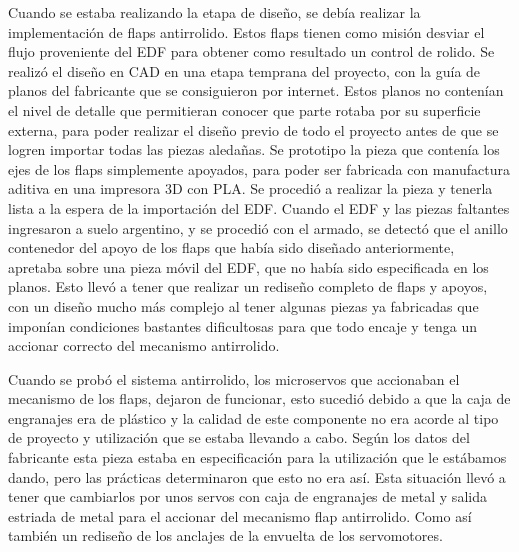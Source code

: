 Cuando se estaba realizando la etapa de diseño, se debía realizar la implementación de flaps antirrolido. Estos flaps tienen como misión desviar el flujo proveniente del EDF para obtener como resultado un control de rolido. Se realizó el diseño en CAD en una etapa temprana del proyecto, con la guía de planos del fabricante que se consiguieron por internet. Estos planos no contenían el nivel de detalle que permitieran conocer que parte rotaba por su superficie externa, para poder realizar el diseño previo de todo el proyecto antes de que se logren importar todas las piezas aledañas. Se prototipo la pieza que contenía los ejes de los flaps simplemente apoyados, para poder ser fabricada con manufactura aditiva en una impresora 3D con PLA. Se procedió a realizar la pieza y tenerla lista a la espera de la importación del EDF. Cuando el EDF y las piezas faltantes ingresaron a suelo argentino, y se procedió con el armado, se detectó que el anillo contenedor del apoyo de los flaps que había sido diseñado anteriormente, apretaba sobre una pieza móvil del EDF, que no había sido especificada en los planos. Esto llevó a tener que realizar un rediseño completo de flaps y apoyos, con un diseño mucho más complejo al tener algunas piezas ya fabricadas que imponían condiciones bastantes dificultosas para que todo encaje y tenga un accionar correcto del mecanismo antirrolido.

\medskip

Cuando se probó el sistema antirrolido, los microservos que accionaban el mecanismo de los flaps, dejaron de funcionar, esto sucedió debido a que la caja de engranajes era de plástico y la calidad de este componente no era acorde al tipo de proyecto y utilización que se estaba llevando a cabo. Según los datos del fabricante esta pieza estaba en especificación para la utilización que le estábamos dando, pero las prácticas determinaron que esto no era así. Esta situación llevó a tener que cambiarlos por unos servos con caja de engranajes de metal y salida estriada de metal para el accionar del mecanismo flap antirrolido. Como así también un rediseño de los anclajes de la envuelta de los servomotores.
